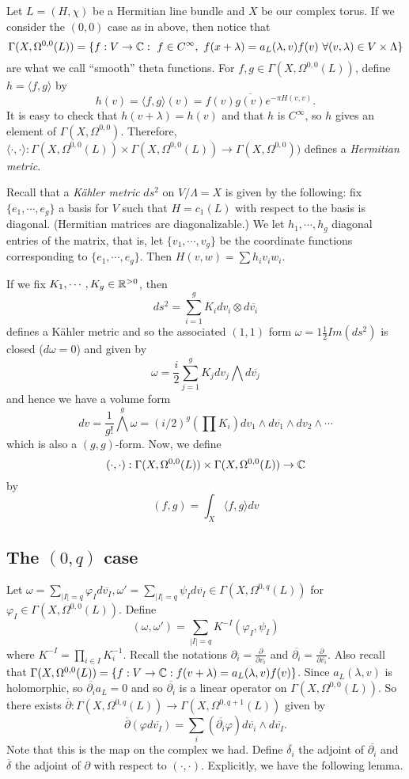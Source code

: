 Let $L=(H,\chi)$ be a Hermitian line bundle and $X$ be our complex torus. If we consider the $(0,0)$ case as in above, then notice that 
\[
\Gamma(X,\Omega^{0,0}(L))=\{f:V\to \CC:\ f\in C^\infty,\ 
f(x+\lambda)=a_L(\lambda,v)f(v)\ \forall (v,\lambda)\in V\times \Lambda\}
\]
are what we call ``smooth'' theta functions. For $f,g\in \Gamma(X,\Omega^{0,0}(L))$, define $h=\langle f,g\rangle$ by 
\[
h(v)=\langle f,g \rangle (v) = f(v)\overline{g(v)}e^{-\pi H(v,v)}.
\]
It is easy to check that $h(v+\lambda)=h(v)$ and that $h$ is $C^\infty$, so $h$ gives an element of $\Gamma(X,\Omega^{0,0})$. Therefore, $\langle \cdot ,\cdot \rangle: \Gamma(X,\Omega^{0,0}(L))\times \Gamma(X,\Omega^{0,0}(L))\to \Gamma(X,\Omega^{0,0}))$ defines a \emph{Hermitian metric}. 

Recall that a \emph{K\"{a}hler metric} $ds^2$ on $V/\Lambda=X$ is given by the following: fix $\{e_1,\cdots, e_g\}$ a basis for $V$ such that $H=c_1(L)$ with respect to the basis is diagonal. (Hermitian matrices are diagonalizable.) We let $h_1,\cdots, h_g$ diagonal entries of the matrix, that is, let $\{v_1,\cdots,v_g\}$ be the coordinate functions corresponding to $\{e_1,\cdots, e_g\}$. Then 
$H(v,w)=\sum h_i v_i w_i$.

If we fix $K_1,\cdots, K_g\in {\mathbb R}^{>0}$, then 
\[
ds^2=\sum_{i=1}^g K_i dv_i\otimes d\overline{v_i}
\]
defines a K\"{a}hler metric
 and so the associated $(1,1)$ form $\omega=1\frac{1}{2}Im(ds^2)$ is closed ($d\omega=0$) and given by 
\[
\omega=\frac{i}{2}\sum_{j=1}^g K_j dv_j\bigwedge d\overline{v_j}
\]
and hence we have a volume form 
\[
dv=\frac{1}{g!}\bigwedge^g \omega = (i/2)^g (\prod K_i) dv_1\wedge d\overline{v_1}\wedge dv_2\wedge\cdots
\]
which is also a $(g,g)$-form. Now, we define 
\[
(\cdot, \cdot):\Gamma(X,\Omega^{0,0}(L))\times \Gamma(X,\Omega^{0,0}(L))\to {\mathbb C}
\]
by 
\[
(f,g)=\int_X \langle f,g\rangle dv
\]

\subsection{The $(0,q)$ case}
Let $\omega=\sum_{|I|=q}\varphi_I d\overline{v_I}, \omega'=\sum_{|I|=q}\psi_I d\overline{v_I}\in \Gamma(X,\Omega^{0,q}(L))$ for $\varphi_I\in \Gamma(X,\Omega^{0,0}(L))$. Define 
\[
(\omega,\omega')=\sum_{|I|=q} K^{-I}(\varphi_I,\psi_I)
\]
where $K^{-I}=\prod_{i\in I} K_i^{-1}$. Recall the notations $\partial_i=\frac{\partial}{\partial v_i}$ and $\overline{\partial_i}=\frac{\partial}{\partial \overline{v_i}}$. Also recall that $\Gamma(X,\Omega^{0,0}(L))=\{f:V\to {\mathbb C}: f(v+\lambda)=a_L(\lambda,v)f(v)\}$. Since $a_L(\lambda,v)$ is holomorphic, so $\overline{\partial_i}a_L=0$ and so $\overline{\partial_i}$ is a linear operator on $\Gamma(X,\Omega^{0,0}(L))$. So there exists $\overline{\partial}:\Gamma(X,\Omega^{0,q}(L))\to \Gamma(X,\Omega^{0,q+1}(L))$ given by 
\[
\overline{\partial}(\varphi d\overline{v_I})=\sum_i (\overline{\partial_i}\varphi) d\overline{v_i}\wedge d\overline{v_I}.
\]
Note that this is the map on the complex we had. Define $\overline{\delta_i}$ the adjoint of $\overline{\partial_i}$ and $\overline{\delta}$ the adjoint of $\partial$ with respect to $(\cdot,\cdot)$. Explicitly, we have the following lemma.

